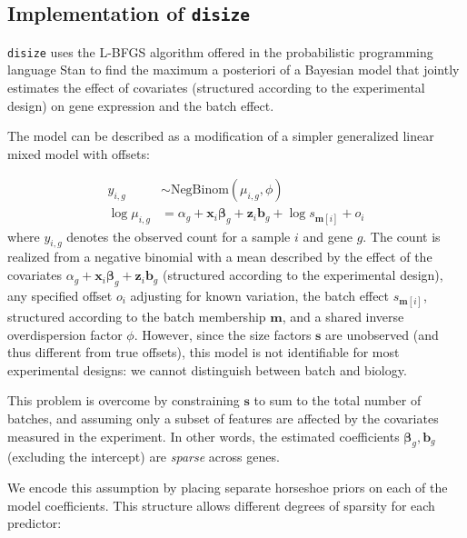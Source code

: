 \documentclass[10pt,letterpaper]{article}
\begin{document}
\subsection*{Implementation of \texttt{disize}}

\texttt{disize} uses the L-BFGS algorithm offered in the probabilistic programming language Stan to find the maximum a posteriori of a Bayesian model that jointly estimates the effect of covariates (structured according to the experimental design) on gene expression and the batch effect.

The model can be described as a modification of a simpler generalized linear mixed model with offsets:

\begin{subequations}
    \begin{align}
        y_{i,g} &\sim \text{NegBinom}(\mu_{i,g}, \phi) \\
        \log \mu_{i,g} &= \alpha_g + \boldsymbol{x}_i \boldsymbol{\beta}_g + \boldsymbol{z}_i \boldsymbol{b}_g + \log s_{\boldsymbol{m}[i]} + o_i
    \end{align}
\end{subequations}
where $y_{i,g}$ denotes the observed count for a sample $i$ and gene $g$. 
The count is realized from a negative binomial with a mean described by the effect of the covariates $\alpha_g + \boldsymbol{x}_i \boldsymbol{\beta}_g + \boldsymbol{z}_i \boldsymbol{b}_g$ (structured according to the experimental design), any specified offset $o_i$ adjusting for known variation, the batch effect $s_{\boldsymbol{m}[i]}$, structured according to the batch membership $\boldsymbol{m}$, and a shared inverse overdispersion factor $\phi$.
However, since the size factors $\boldsymbol{s}$ are unobserved (and thus different from true offsets), this model is not identifiable for most experimental designs: we cannot distinguish between batch and biology.

This problem is overcome by constraining $\boldsymbol{s}$ to sum to the total number of batches, and assuming only a subset of features are affected by the covariates measured in the experiment. 
In other words, the estimated coefficients $\boldsymbol{\beta}_g, \boldsymbol{b}_g$ (excluding the intercept) are \textit{sparse} across genes.

We encode this assumption by placing separate horseshoe priors \cite{carvalho_handling_2009} on each of the model coefficients.
This structure allows different degrees of sparsity for each predictor:
\end{document}
